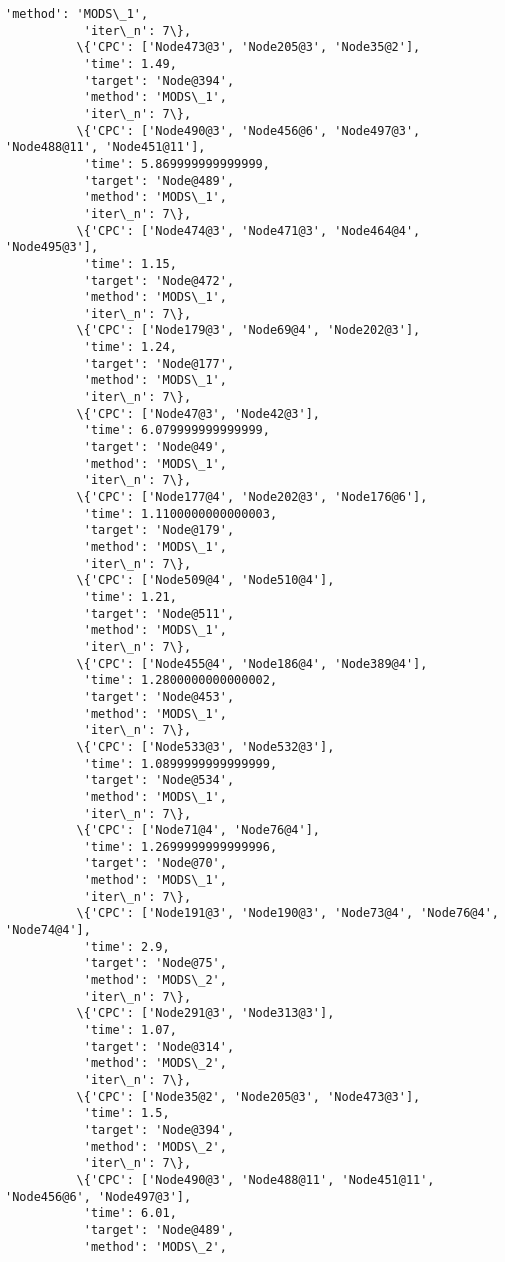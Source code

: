 \documentclass[11pt]{article}
\begin{document}
\begin{Verbatim}[commandchars=\\\{\}]
           'method': 'MODS\_1',
           'iter\_n': 7\},
          \{'CPC': ['Node473@3', 'Node205@3', 'Node35@2'],
           'time': 1.49,
           'target': 'Node@394',
           'method': 'MODS\_1',
           'iter\_n': 7\},
          \{'CPC': ['Node490@3', 'Node456@6', 'Node497@3', 'Node488@11', 'Node451@11'],
           'time': 5.869999999999999,
           'target': 'Node@489',
           'method': 'MODS\_1',
           'iter\_n': 7\},
          \{'CPC': ['Node474@3', 'Node471@3', 'Node464@4', 'Node495@3'],
           'time': 1.15,
           'target': 'Node@472',
           'method': 'MODS\_1',
           'iter\_n': 7\},
          \{'CPC': ['Node179@3', 'Node69@4', 'Node202@3'],
           'time': 1.24,
           'target': 'Node@177',
           'method': 'MODS\_1',
           'iter\_n': 7\},
          \{'CPC': ['Node47@3', 'Node42@3'],
           'time': 6.079999999999999,
           'target': 'Node@49',
           'method': 'MODS\_1',
           'iter\_n': 7\},
          \{'CPC': ['Node177@4', 'Node202@3', 'Node176@6'],
           'time': 1.1100000000000003,
           'target': 'Node@179',
           'method': 'MODS\_1',
           'iter\_n': 7\},
          \{'CPC': ['Node509@4', 'Node510@4'],
           'time': 1.21,
           'target': 'Node@511',
           'method': 'MODS\_1',
           'iter\_n': 7\},
          \{'CPC': ['Node455@4', 'Node186@4', 'Node389@4'],
           'time': 1.2800000000000002,
           'target': 'Node@453',
           'method': 'MODS\_1',
           'iter\_n': 7\},
          \{'CPC': ['Node533@3', 'Node532@3'],
           'time': 1.0899999999999999,
           'target': 'Node@534',
           'method': 'MODS\_1',
           'iter\_n': 7\},
          \{'CPC': ['Node71@4', 'Node76@4'],
           'time': 1.2699999999999996,
           'target': 'Node@70',
           'method': 'MODS\_1',
           'iter\_n': 7\},
          \{'CPC': ['Node191@3', 'Node190@3', 'Node73@4', 'Node76@4', 'Node74@4'],
           'time': 2.9,
           'target': 'Node@75',
           'method': 'MODS\_2',
           'iter\_n': 7\},
          \{'CPC': ['Node291@3', 'Node313@3'],
           'time': 1.07,
           'target': 'Node@314',
           'method': 'MODS\_2',
           'iter\_n': 7\},
          \{'CPC': ['Node35@2', 'Node205@3', 'Node473@3'],
           'time': 1.5,
           'target': 'Node@394',
           'method': 'MODS\_2',
           'iter\_n': 7\},
          \{'CPC': ['Node490@3', 'Node488@11', 'Node451@11', 'Node456@6', 'Node497@3'],
           'time': 6.01,
           'target': 'Node@489',
           'method': 'MODS\_2',

\end{Verbatim}
\end{document}
